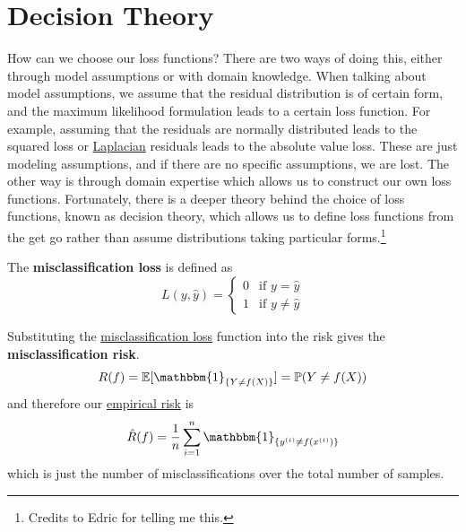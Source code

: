 \section{Decision Theory}

  How can we choose our loss functions? There are two ways of doing this, either through model assumptions or with domain knowledge. When talking about model assumptions, we assume that the residual distribution is of certain form, and the maximum likelihood formulation leads to a certain loss function. For example, assuming that the residuals are normally distributed leads to the squared loss or \hyperref[mv-def:laplacian]{Laplacian} residuals leads to the absolute value loss. These are just modeling assumptions, and if there are no specific assumptions, we are lost. The other way is through domain expertise which allows us to construct our own loss functions. Fortunately, there is a deeper theory behind the choice of loss functions, known as decision theory, which allows us to define loss functions from the get go rather than assume distributions taking particular forms.\footnote{Credits to Edric for telling me this.}

  \begin{definition}
    \label{def:misclassification-loss}
    The \textbf{misclassification loss} is defined as 
    \begin{equation}
      L(y, \hat{y}) = \begin{cases} 0 & \text{if } y = \hat{y} \\ 1 & \text{if } y \neq \hat{y} \end{cases}
    \end{equation}
  \end{definition}

  \begin{example}
    \label{ex:misclassification-risk}
    Substituting the \hyperref[def:misclassification-loss]{misclassification loss} function into the risk gives the \textbf{misclassification risk}. 
    \begin{equation}
      R(f) = \mathbb{E} [\mathbbm{1}_{\{Y \neq f(X)\}}] = \mathbb{P}(Y \neq f(X)) 
    \end{equation}
    and therefore our \hyperref[def:empirical-risk]{empirical risk} is 
    \begin{equation}
      \hat{R} (f) = \frac{1}{n} \sum_{i=1}^n \mathbbm{1}_{\{y^{(i)} \neq f(x^{(i)})\}}
    \end{equation}
    which is just the number of misclassifications over the total number of samples. 
  \end{example}

